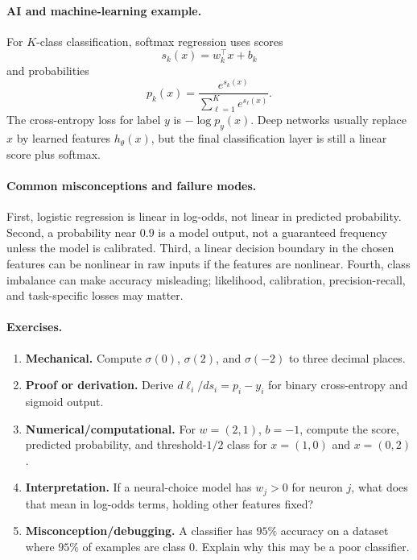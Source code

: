 \paragraph{AI and machine-learning example.}
For \(K\)-class classification, softmax regression uses scores
\[
s_k(x)=w_k^\top x+b_k
\]
and probabilities
\[
p_k(x)=\frac{e^{s_k(x)}}{\sum_{\ell=1}^K e^{s_\ell(x)}}.
\]
The cross-entropy loss for label \(y\) is \(-\log p_y(x)\). Deep networks usually replace \(x\) by learned features \(h_\theta(x)\), but the final classification layer is still a linear score plus softmax.

\paragraph{Common misconceptions and failure modes.}
First, logistic regression is linear in log-odds, not linear in predicted probability. Second, a probability near \(0.9\) is a model output, not a guaranteed frequency unless the model is calibrated. Third, a linear decision boundary in the chosen features can be nonlinear in raw inputs if the features are nonlinear. Fourth, class imbalance can make accuracy misleading; likelihood, calibration, precision-recall, and task-specific losses may matter.

\paragraph{Exercises.}
\begin{enumerate}[label=\textbf{32.2.\arabic*.}, leftmargin=*]
\item \textbf{Mechanical.} Compute \(\sigma(0)\), \(\sigma(2)\), and \(\sigma(-2)\) to three decimal places.
\item \textbf{Proof or derivation.} Derive \(d\ell_i/ds_i=p_i-y_i\) for binary cross-entropy and sigmoid output.
\item \textbf{Numerical/computational.} For \(w=(2,1)\), \(b=-1\), compute the score, predicted probability, and threshold-\(1/2\) class for \(x=(1,0)\) and \(x=(0,2)\).
\item \textbf{Interpretation.} If a neural-choice model has \(w_j>0\) for neuron \(j\), what does that mean in log-odds terms, holding other features fixed?
\item \textbf{Misconception/debugging.} A classifier has \(95\%\) accuracy on a dataset where \(95\%\) of examples are class \(0\). Explain why this may be a poor classifier.
\end{enumerate}


